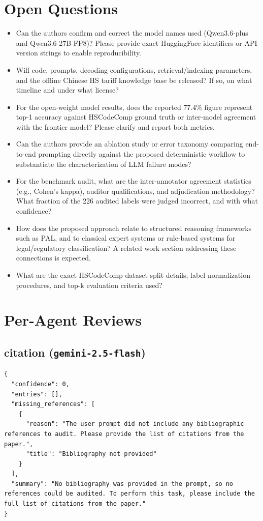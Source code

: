 \documentclass[11pt]{article}
\begin{document}
\section*{Open Questions}
\begin{itemize}[leftmargin=*]
  \item Can the authors confirm and correct the model names used (Qwen3.6-plus and Qwen3.6-27B-FP8)? Please provide exact HuggingFace identifiers or API version strings to enable reproducibility.
  \item Will code, prompts, decoding configurations, retrieval/indexing parameters, and the offline Chinese HS tariff knowledge base be released? If so, on what timeline and under what license?
  \item For the open-weight model results, does the reported 77.4\% figure represent top-1 accuracy against HSCodeComp ground truth or inter-model agreement with the frontier model? Please clarify and report both metrics.
  \item Can the authors provide an ablation study or error taxonomy comparing end-to-end prompting directly against the proposed deterministic workflow to substantiate the characterization of LLM failure modes?
  \item For the benchmark audit, what are the inter-annotator agreement statistics (e.g., Cohen's kappa), auditor qualifications, and adjudication methodology? What fraction of the 226 audited labels were judged incorrect, and with what confidence?
  \item How does the proposed approach relate to structured reasoning frameworks such as PAL, and to classical expert systems or rule-based systems for legal/regulatory classification? A related work section addressing these connections is expected.
  \item What are the exact HSCodeComp dataset split details, label normalization procedures, and top-k evaluation criteria used?
\end{itemize}

\section*{Per-Agent Reviews}
\subsection*{citation (\texttt{gemini-2.5-flash})}
\begin{verbatim}
{
  "confidence": 0,
  "entries": [],
  "missing_references": [
    {
      "reason": "The user prompt did not include any bibliographic references to audit. Please provide the list of citations from the paper.",
      "title": "Bibliography not provided"
    }
  ],
  "summary": "No bibliography was provided in the prompt, so no references could be audited. To perform this task, please include the full list of citations from the paper."
}
\end{verbatim}
\end{document}

